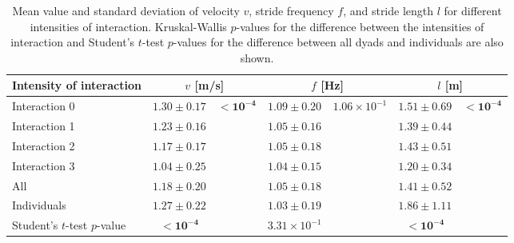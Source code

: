 \begin{table}

\centering
\caption{Mean value and standard deviation of velocity $v$, stride frequency $f$, and stride length $l$ for different intensities of interaction. Kruskal-Wallis $p$-values for the difference between the intensities of interaction and Student's $t$-test $p$-values for the difference between all dyads and individuals are also shown.}
\label{tab:gait_stats}
\begin{tabular}{lcccccc}
\toprule
Intensity of interaction & \multicolumn{2}{c}{$v$ [m/s]} & \multicolumn{2}{c}{$f$ [Hz]} & \multicolumn{2}{c}{$l$ [m]} \\
\midrule
Interaction 0 & $1.30 \pm 0.17$ & \multirow{4}{*}{$\mathbf{< 10^{-4}}$} &$1.09 \pm 0.20$ & \multirow{4}{*}{$1.06 \times 10^{-1}$} &$1.51 \pm 0.69$ & \multirow{4}{*}{$\mathbf{< 10^{-4}}$} \\
Interaction 1 & $1.23 \pm 0.16$ & &$1.05 \pm 0.16$ & &$1.39 \pm 0.44$ & \\
Interaction 2 & $1.17 \pm 0.17$ & &$1.05 \pm 0.18$ & &$1.43 \pm 0.51$ & \\
Interaction 3 & $1.04 \pm 0.25$ & &$1.04 \pm 0.15$ & &$1.20 \pm 0.34$ & \\
\midrule
All & $1.18 \pm 0.20$ & &$1.05 \pm 0.18$ & &$1.41 \pm 0.52$ &\\
Individuals & $1.27 \pm 0.22$ & & $1.03 \pm 0.19$ & &$1.86 \pm 1.11$  & \\
\midrule
Student's $t$-test $p$-value & $\mathbf{< 10^{-4}}$ & &$3.31 \times 10^{-1}$ & &$\mathbf{< 10^{-4}}$ &\\
\bottomrule
\end{tabular}
\end{table}
